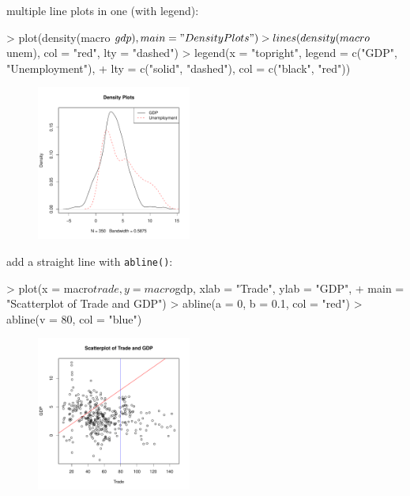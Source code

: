\documentclass[handout]{beamer}
\newcommand{\red}{\color{red}}
\begin{document}
\begin{frame}[fragile]
multiple line plots in one (with legend):
\red
\footnotesize
\medskip
\begin{Schunk}
\begin{Sinput}
> plot(density(macro$gdp), main = "Density Plots")
> lines(density(macro$unem), col = "red", lty = "dashed")
> legend(x = "topright", legend = c("GDP", "Unemployment"), 
+     lty = c("solid", "dashed"), col = c("black", "red"))
\end{Sinput}
\end{Schunk}
\begin{figure}
\includegraphics[width=2in, height=2in]{rslides-plot3.pdf}
\end{figure}
\end{frame}

\begin{frame}[fragile]
add a straight line with {\tt \red abline()}:
\red
\footnotesize
\medskip
\begin{Schunk}
\begin{Sinput}
> plot(x = macro$trade, y = macro$gdp, xlab = "Trade", ylab = "GDP", 
+     main = "Scatterplot of Trade and GDP")
> abline(a = 0, b = 0.1, col = "red")
> abline(v = 80, col = "blue")
\end{Sinput}
\end{Schunk}
\begin{figure}
\includegraphics[width=2in, height=2in]{rslides-plot4.pdf}
\end{figure}
\end{frame}
\end{document}
